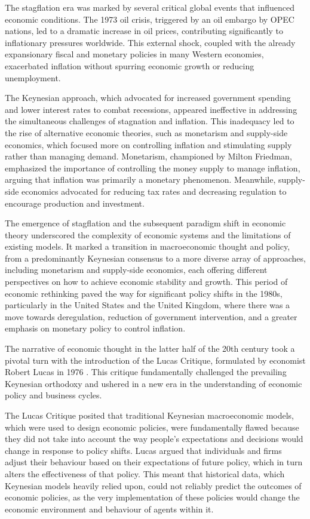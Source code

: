 \documentclass[12pt]{article}
\begin{document}
The stagflation era was marked by several critical global events that influenced economic conditions. The 1973 oil
crisis, triggered by an oil embargo by OPEC nations, led to a dramatic increase in oil prices, contributing
significantly to inflationary pressures worldwide. This external shock, coupled with the already expansionary fiscal and
monetary policies in many Western economies, exacerbated inflation without spurring economic growth or reducing
unemployment. 

The Keynesian approach, which advocated for increased government spending and lower interest rates to combat recessions,
appeared ineffective in addressing the simultaneous challenges of stagnation and inflation. This inadequacy led to the
rise of alternative economic theories, such as monetarism and supply-side economics, which focused more on controlling
inflation and stimulating supply rather than managing demand. Monetarism, championed by Milton Friedman, emphasized the
importance of controlling the money supply to manage inflation, arguing that inflation was primarily a monetary
phenomenon\cite{Fri72}. Meanwhile, supply-side economics advocated for reducing tax rates and decreasing regulation to encourage
production and investment. 

The emergence of stagflation and the subsequent paradigm shift in economic theory underscored the complexity of economic
systems and the limitations of existing models. It marked a transition in macroeconomic thought and policy, from a
predominantly Keynesian consensus to a more diverse array of approaches, including monetarism and supply-side economics,
each offering different perspectives on how to achieve economic stability and growth. This period of economic rethinking
paved the way for significant policy shifts in the 1980s, particularly in the United States and the United Kingdom,
where there was a move towards deregulation, reduction of government intervention, and a greater emphasis on monetary
policy to control inflation. 

The narrative of economic thought in the latter half of the 20th century took a pivotal turn with the introduction of
the Lucas Critique, formulated by economist Robert Lucas in 1976 \cite{Luc76}. This critique fundamentally challenged the prevailing
Keynesian orthodoxy and ushered in a new era in the understanding of economic policy and business cycles. 

The Lucas Critique posited that traditional Keynesian macroeconomic models, which were used to design economic policies,
were fundamentally flawed because they did not take into account the way people's expectations and decisions would
change in response to policy shifts. Lucas argued that individuals and firms adjust their behaviour based on their
expectations of future policy, which in turn alters the effectiveness of that policy. This meant that historical data,
which Keynesian models heavily relied upon, could not reliably predict the outcomes of economic policies, as the  very
implementation of these policies would change the economic environment and behaviour of agents within it.
\end{document}
